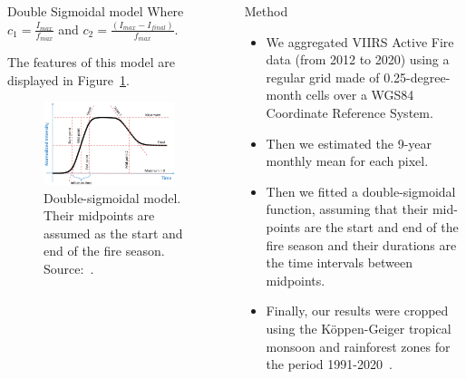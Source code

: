 \documentclass[20pt]{beamer}
\begin{document}
\begin{frame}[fragile,t]
\begin{columns}[t]
\begin{column}{0.33\linewidth}
\begin{block}{Double Sigmoidal model\vphantom{g}}
Where $c_{1} = \frac{I_{max}}{f_{max}}$ and $c_{2} = \frac{(I_{max} - I_{final})}{f_{max}}$.

    \vspace{0.5cm}

The features of this model are displayed in Figure~\ref{fig:double-sigmoidal_model}.

\begin{figure}[ht]
    \centering
    \includegraphics[width=0.9\textwidth]{images/caglar2018_double_sigmoidal_model.png}
    \caption{Double-sigmoidal model. Their midpoints are assumed as the start and end of the fire season. Source:~\cite{caglar2018}.}
    \label{fig:double-sigmoidal_model}
\end{figure}


    \end{block}

\end{column}




\begin{column}{0.33\linewidth}

    \vspace{1.0cm}

    \begin{block}{Method\vphantom{g}}
\vspace{1cm}
\begin{itemize}
    \item We aggregated VIIRS Active Fire data (from 2012 to 2020) using a regular grid made of 0.25-degree-month cells over a WGS84 Coordinate Reference System.
    \item Then we estimated the 9-year monthly mean for each pixel.
    \item Then we fitted a double-sigmoidal function, assuming that their mid-points are the start and end of the fire season and their durations are the time intervals between midpoints. 
    \item Finally, our results were cropped using the K\"{o}ppen-Geiger tropical monsoon and rainforest zones for the period 1991-2020~\cite{beck2023}.
\end{itemize}


\end{block}
\end{column}
\end{columns}
\end{frame}
\end{document}
